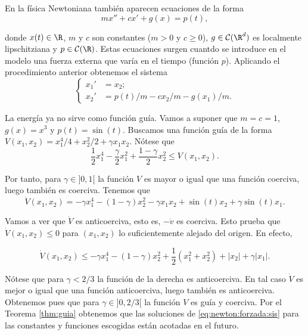\documentclass{article}
\begin{document}
\begin{ex}
  En la física Newtoniana también aparecen ecuaciones de la forma
  \begin{equation}
    \label{eq:newton:forzada}
    m x'' + cx' + g(x) = p(t),
  \end{equation}

  donde $x(t) \in \R$, $m$ y $c$ son constantes ($m > 0$ y $c \ge 0$), $g \in \mathcal{C}(\R^d)$ es
  localmente lipschitziana y $p \in \mathcal{C}(\R)$. Estas ecuaciones surgen cuantdo se introduce
  en el modelo una fuerza externa que varía en el tiempo (función $p$). Aplicando el procedimiento
  anterior obtenemos el sistema
  \begin{equation}
    \label{eq:newton:forzada:sis}
    \begin{cases}
      x_1' & = x_2; \\
      x_2' & = p(t)/m -c x_2 /m - g(x_1) / m.
    \end{cases}
  \end{equation}

  La energía ya no sirve como función guía. Vamos a suponer que $m = c = 1$, $g(x) = x^3$ y
  $p(t) = \sin(t)$. Buscamos una función guía de la forma
  $V(x_1, x_2) = x_1^4/4 + x_2^2/2 + \gamma x_1 x_2$. Nótese que
  \[ \frac{1}{2} x_1^4 - \frac{\gamma}{2}x_1^2 + \frac{1 - \gamma}{2}x_2^2 \le V(x_1,x_2). \]

  Por tanto, para $\gamma \in ]0,1[$ la función $V$ es mayor o igual que una función coerciva, luego
  también es coerciva. Tenemos que
  \[ \dot{V}(x_1, x_2) = - \gamma x_1^4 - (1 - \gamma) x_2^2 - \gamma x_1x_2 + \sin(t)x_2 + \gamma
    \sin(t)x_1. \]

  Vamos a ver que $\dot{V}$ es anticoerciva, esto es, $-\dot{v}$ es coerciva. Esto prueba que
  $\dot{V}(x_1, x_2) \le 0$ para $(x_1, x_2)$ lo suficientemente alejado del origen. En efecto,

  \[ \dot{V}(x_1, x_2) \le - \gamma x_1^4 - (1 - \gamma) x_2^2 + \frac{1}{2}(x_1^2 + x_2^2) + |x_2|
    + \gamma |x_1|. \]

  Nótese que para $\gamma < 2/3$ la función de la derecha es anticoerciva. En tal caso $\dot{V}$ es
  mejor o igual que una función anticoerciva, luego también es anticoerciva. Obtenemos pues que para
  $\gamma \in ]0,2/3[$ la función $V$ es guía y coerciva. Por el Teorema \ref{thm:guia} obtenemos
  que las soluciones de \eqref{eq:newton:forzada:sis} para las constantes y funciones escogidas
  están acotadas en el futuro.
\end{ex}
\end{document}
